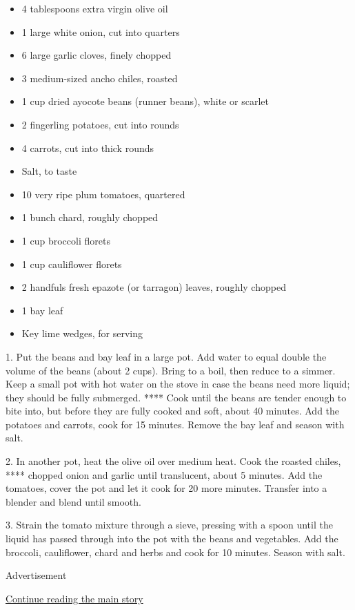 \begin{itemize}
\item
  4 tablespoons extra virgin olive oil
\item
  1 large white onion, cut into quarters
\item
  6 large garlic cloves, finely chopped
\item
  3 medium-sized ancho chiles, roasted
\item
  1 cup dried ayocote beans (runner beans), white or scarlet
\item
  2 fingerling potatoes, cut into rounds
\item
  4 carrots, cut into thick rounds
\item
  Salt, to taste
\item
  10 very ripe plum tomatoes, quartered
\item
  1 bunch chard, roughly chopped
\item
  1 cup broccoli florets
\item
  1 cup cauliflower florets
\item
  2 handfuls fresh epazote (or tarragon) leaves, roughly chopped
\item
  1 bay leaf
\item
  Key lime wedges, for serving
\end{itemize}

1. Put the beans and bay leaf in a large pot. Add water to equal double
the volume of the beans (about 2 cups). Bring to a boil, then reduce to
a simmer. Keep a small pot with hot water on the stove in case the beans
need more liquid; they should be fully submerged. **** Cook until the
beans are tender enough to bite into, but before they are fully cooked
and soft, about 40 minutes. Add the potatoes and carrots, cook for 15
minutes. Remove the bay leaf and season with salt.

2. In another pot, heat the olive oil over medium heat. Cook the roasted
chiles, **** chopped onion and garlic until translucent, about 5
minutes. Add the tomatoes, cover the pot and let it cook for 20 more
minutes. Transfer into a blender and blend until smooth.

3. Strain the tomato mixture through a sieve, pressing with a spoon
until the liquid has passed through into the pot with the beans and
vegetables. Add the broccoli, cauliflower, chard and herbs and cook for
10 minutes. Season with salt.

Advertisement

\protect\hyperlink{after-bottom}{Continue reading the main story}

